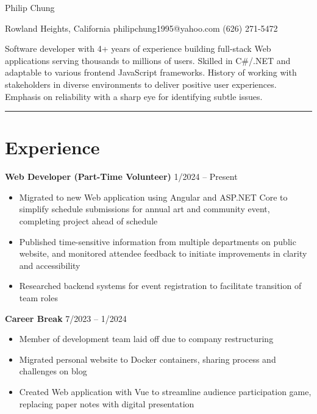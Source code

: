 \documentclass[12pt]{article}
\newcommand{\primaryheader}[4]{
	\textbf{#1}
	\ifthenelse{\equal{#3}{}}{}{%
		\symbol{"B7} #3 \ifthenelse{\equal{#4}{}}{}{(#4)}
	}
	\hfill #2%
}
\begin{document}
	{\centering

		{\headerfont\fontsize{24pt}{24pt}\selectfont Philip Chung}

		\vspace{0.25em}

		{\fontsize{10pt}{10pt}\selectfont Rowland Heights, California  philipchung1995@yahoo.com  (626) 271-5472}

	}

	\vspace{0.25em}

	{\fontsize{11pt}{14pt}\selectfont

		Software developer with 4+ years of experience building full-stack Web applications serving thousands to millions of users. Skilled in C\#/.NET and adaptable to various frontend JavaScript frameworks. History of working with stakeholders in diverse environments to deliver positive user experiences. Emphasis on reliability with a sharp eye for identifying subtle issues.

	}

	\rule{\textwidth}{1pt}

	\section*{Experience}

	\primaryheader{Web Developer (Part-Time Volunteer)}{1/2024 -- Present}{PNW}{Remote}

	\begin{itemize}
		\item Migrated to new Web application using Angular and ASP.NET Core to simplify schedule submissions for annual art and community event, completing project ahead of schedule
		\item Published time-sensitive information from multiple departments on public website, and monitored attendee feedback to initiate improvements in clarity and accessibility
		\item Researched backend systems for event registration to facilitate transition of team roles
	\end{itemize}

	\primaryheader{Career Break}{7/2023 -- 1/2024}{}{}

	\begin{itemize}
		\item Member of development team laid off due to company restructuring
		\item Migrated personal website to Docker containers, sharing process and challenges on blog
		\item Created Web application with Vue to streamline audience participation game, replacing paper notes with digital presentation
	\end{itemize}
\end{document}
